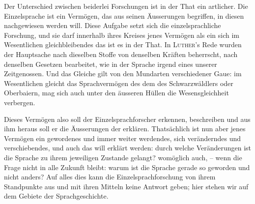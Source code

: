 Der Unterschied zwischen beiderlei Forschungen ist in der That ein artlicher. Die Einzelsprache ist ein Vermögen, das aus seinen Äusserungen \label{fp.149} begriffen, in diesen nachgewiesen werden will. Diese Aufgabe setzt sich die einzelsprachliche Forschung, und sie darf innerhalb ihres Kreises jenes Vermögen als ein sich im Wesentlichen gleichbleibendes  das ist es in der That. In \textsc{Luther}’s Rede wurden der Hauptsache nach dieselben Stoffe von denselben Kräften beherrscht, nach denselben Gesetzen bearbeitet, wie in der Sprache irgend eines unserer Zeitgenossen. Und das Gleiche gilt von den Mundarten verschiedener Gaue: im Wesentlichen gleicht das Sprachvermögen des  dem des Schwarzwäldlers oder Oberbaiern, mag sich auch unter den äusseren Hüllen die Wesensgleichheit verbergen.

Dieses Vermögen also soll der Einzelsprachforscher erkennen, beschreiben\fed{,} und aus ihm heraus soll er die Äusserungen der  erklären. Thatsächlich ist nun aber jenes Vermögen ein gewordenes und immer weiter werdendes, sich veränderndes und verschiebendes, und auch das will erklärt werden: durch welche Veränderungen ist die Sprache zu ihrem jeweiligen Zustande gelangt? womöglich auch, – wenn die Frage nicht in alle Zukunft  bleibt: warum ist die Sprache gerade so geworden und nicht anders? Auf alles dies kann die Einzelsprachforschung von ihrem Standpunkte aus und mit ihren Mitteln keine Antwort geben; hier stehen wir auf dem Gebiete der Sprachgeschichte.

\label{sp.140}

